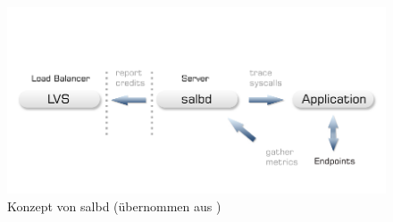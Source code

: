 \documentclass[a4paper, 12pt, BCOR10mm, DIV12, toc=bibliography, toc=listof, german]{scrbook}
\begin{document}


		\begin{figure}
			\centering
			\includegraphics[width=\textwidth]{images/salbd-concept.png}
			\caption{Konzept von salbd (übernommen aus \cite{zinke2012})}
			\label{fig:salbd}
		\end{figure}
		




	$~$\\
\end{document}
